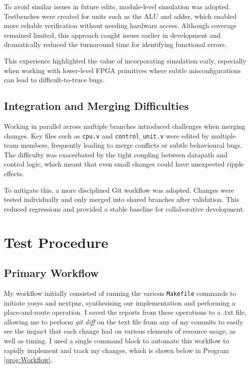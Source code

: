 \documentclass[a4paper,10pt]{article}
\begin{document}
To avoid similar issues in future edits, module-level simulation was adopted. 
Testbenches were created for units such as the ALU and adder, 
which enabled more reliable verification without needing hardware access. 
Although coverage remained limited, this approach caught issues 
earlier in development and dramatically reduced the turnaround time 
for identifying functional errors.

This experience highlighted the value of incorporating simulation early, 
especially when working with lower-level FPGA primitives where 
subtle misconfigurations can lead to difficult-to-trace bugs.

\subsection*{Integration and Merging Difficulties}
Working in parallel across multiple branches 
introduced challenges when merging changes. 
Key files such as \texttt{cpu.v} and \texttt{control\_unit.v} 
were edited by multiple team members, 
frequently leading to merge conflicts or subtle behavioural bugs. 
The difficulty was exacerbated by the tight coupling 
between datapath and control logic, 
which meant that even small changes could have unexpected ripple effects.

To mitigate this, a more disciplined Git workflow was adopted. 
Changes were tested individually and only merged 
into shared branches after validation. 
This reduced regressions and provided a stable baseline 
for collaborative development.

\section{Test Procedure}
\label{sec:Test_Procedure}

\subsection*{Primary Workflow}
My workflow initially consisted of running the various \texttt{Makefile}
commands to initiate yosys and nextpnr, 
synthesising our implementation and performing a place-and-route operation.
I saved the reports from these operations to a .txt file, 
allowing me to perform \textit{git diff} on the text file 
from any of my commits to easily see the impact that each change had 
on various elements of resource usage, as well as timing.
I used a single command block to automate this workflow 
to rapidly implement and track my changes, 
which is shown below in Program \ref{prog:Workflow}.
\end{document}
